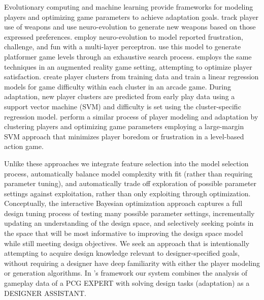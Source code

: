 \documentclass[letterpaper]{article}
\begin{document}


Evolutionary computing and machine learning provide frameworks for modeling players and optimizing game parameters to achieve adaptation goals.
\cite{hastings2009:gar} track player use of weapons and use neuro-evolution to generate new weapons based on those expressed preferences.
\cite{pedersen2009:smb} employ neuro-evolution to model reported frustration, challenge, and fun with a multi-layer perceptron. 
\cite{shaker2010:platformer-gen} use this model to generate platformer game levels through an exhaustive search process. 
\cite{yannakakis2009:playermodel} employs the same techniques in an augmented reality game setting, attempting to optimize player satisfaction.
\cite{missura2009:dda} create player clusters from training data and train a linear regression models for game difficulty within each cluster in an arcade game. During adaptation, new player clusters are predicted from early play data using a support vector machine (SVM) and difficulty is set using the cluster-specific regression model.
\cite{yu2011:minboredom} perform a similar process of player modeling and adaptation by clustering players and optimizing game parameters employing a large-margin SVM approach that minimizes player boredom or frustration in a level-based action game. 

Unlike these  approaches we integrate feature selection into the model selection process, automatically balance model complexity with fit (rather than requiring parameter tuning), and automatically trade off exploration of possible parameter settings against exploitation, rather than only exploiting through optimization. Conceptually, the interactive Bayesian optimization approach captures a full design tuning process of testing many possible parameter settings, incrementally updating an understanding of the design space, and selectively seeking points in the space that will be most informative to improving the design space model while still meeting design objectives. We seek an approach that is intentionally attempting to acquire design knowledge relevant to designer-specified goals, without requiring a designer have deep familiarity with either the player modeling or generation algorithms. In \cite{khaled2013:pcg-metaphor}'s framework our system combines the analysis of gameplay data of a PCG EXPERT with solving design tasks (adaptation) as a DESIGNER ASSISTANT. 
\end{document}

